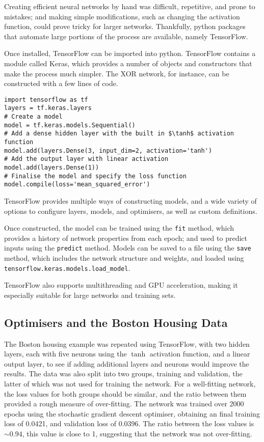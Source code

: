 Creating efficient neural networks by hand was difficult, repetitive, and prone
to mistakes; and making simple modifications, such as changing the activation
function, could prove tricky for larger networks.
Thankfully, python packages that automate large portions of the process are
available, namely TensorFlow.

Once installed, TensorFlow can be imported into python.
TensorFlow contains a module called Keras, which provides a number of objects
and constructors that make the process much simpler.
The XOR network, for instance, can be constructed with a few lines of code.
\begin{verbatim}
import tensorflow as tf
layers = tf.keras.layers
# Create a model
model = tf.keras.models.Sequential()
# Add a dense hidden layer with the built in $\tanh$ activation function
model.add(layers.Dense(3, input_dim=2, activation='tanh')
# Add the output layer with linear activation
model.add(layers.Dense(1))
# Finalise the model and specify the loss function
model.compile(loss='mean_squared_error')
\end{verbatim}
TensorFlow provides multiple ways of constructing models, and a wide variety of
options to configure layers, models, and optimisers, as well as custom
definitions.

Once constructed, the model can be trained using the \texttt{fit} method, which
provides a history of network properties from each epoch; and used to predict
inputs using the \texttt{predict} method.
Models can be saved to a file using the \texttt{save} method, which includes the
network structure and weights, and loaded using
\texttt{tensorflow.keras.models.load\_model}.

TensorFlow also supports multithreading and GPU acceleration, making it
especially suitable for large networks and training sets.



\subsection{Optimisers and the Boston Housing Data}

The Boston housing example was repeated using TensorFlow, with two hidden
layers, each with five neurons using the $\tanh$ activation function, and a
linear output layer, to see if adding additional layers and neurons would
improve the results.
The data was also split into two groups, training and validation, the latter of
which was not used for training the network.
For a well-fitting network, the loss values for both groups should be similar,
and the ratio between them provided a rough measure of over-fitting.
The network was trained over 2000 epochs using the stochastic gradient descent
optimiser, obtaining an final training loss of 0.0421, and validation loss of
0.0396.
The ratio between the loss values is $\sim0.94$, this value is close to 1,
suggesting that the network was not over-fitting.

